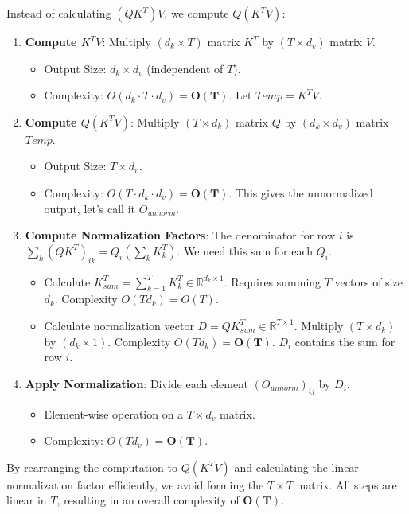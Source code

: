 \documentclass{article}
\begin{document}
\noindent Instead of calculating $(QK^T)V$, we compute $Q(K^T V)$:
\begin{enumerate}
    \item \textbf{Compute $K^T V$}: Multiply $(d_k \times T)$ matrix $K^T$ by $(T \times d_v)$ matrix $V$.
    \begin{itemize}
        \item Output Size: $d_k \times d_v$ (independent of $T$).
        \item Complexity: $O(d_k \cdot T \cdot d_v) = \boldsymbol{O(T)}$. Let $Temp = K^T V$.
    \end{itemize}
    \item \textbf{Compute $Q (K^T V)$}: Multiply $(T \times d_k)$ matrix $Q$ by $(d_k \times d_v)$ matrix $Temp$.
    \begin{itemize}
        \item Output Size: $T \times d_v$.
        \item Complexity: $O(T \cdot d_k \cdot d_v) = \boldsymbol{O(T)}$. This gives the unnormalized output, let's call it $O_{unnorm}$.
    \end{itemize}
    \item \textbf{Compute Normalization Factors}: The denominator for row $i$ is $\sum_k (QK^T)_{ik} = Q_i (\sum_k K_k^T)$. We need this sum for each $Q_i$.
    \begin{itemize}
        \item Calculate $K_{sum}^T = \sum_{k=1}^T K_k^T \in \mathbb{R}^{d_k \times 1}$. Requires summing $T$ vectors of size $d_k$. Complexity $O(T d_k) = O(T)$.
        \item Calculate normalization vector $D = Q K_{sum}^T \in \mathbb{R}^{T \times 1}$. Multiply $(T \times d_k)$ by $(d_k \times 1)$. Complexity $O(T d_k) = \boldsymbol{O(T)}$. $D_i$ contains the sum for row $i$.
    \end{itemize}
    \item \textbf{Apply Normalization}: Divide each element $(O_{unnorm})_{ij}$ by $D_i$.
    \begin{itemize}
        \item Element-wise operation on a $T \times d_v$ matrix.
        \item Complexity: $O(T d_v) = \boldsymbol{O(T)}$.
    \end{itemize}
\end{enumerate}
By rearranging the computation to $Q(K^T V)$ and calculating the linear normalization factor efficiently, we avoid forming the $T \times T$ matrix. All steps are linear in $T$, resulting in an overall complexity of $\boldsymbol{O(T)}$.
\end{document}
